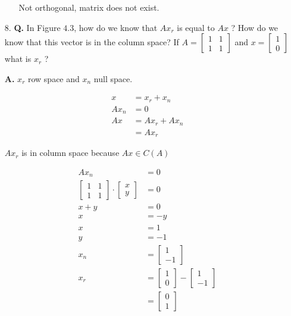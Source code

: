 \documentclass[main.tex]{subfiles}
\begin{document}
\begin{enumerate}
\begin{enumerate}
        Not orthogonal, matrix does not exist.
        
    \end{enumerate}
    
    \item [8.] \textbf{Q.} In Figure $4.3$, how do we know that $A x_{r}$ is equal to $A x$ ? How do we know that this vector is in the column space? If $A=\left[\begin{array}{ll}1 & 1 \\ 1 & 1\end{array}\right]$ and $x=\left[\begin{array}{l}1 \\ 0\end{array}\right]$ what is $x_{r}$ ? 
    
    \textbf{A.} $x_{r}$ row space and $x_{n}$ null space.
    
    $$
    \begin{aligned}
    x &= x_{r}+x_{n}\\
    A x_{n} &= 0 \\
    A x &= A x_{r}+A x_{n} \\
    &= A x_{r}
    \end{aligned}
    $$
    
    $A x_{r}$ is in column space because $A x \in C(A)$
    
    $$
    \begin{aligned}
    A x_{n} &= 0\\
    \left[\begin{array}{ll}
    1 & 1 \\
    1 & 1
    \end{array}\right] \cdot\left[\begin{array}{l}
    x \\
    y
    \end{array}\right] &=0 \\
    x+y &=0 \\
    x &=-y \\
    x&=1 \\
    y&=-1 \\
    x_{n} &= \left[\begin{array}{c}
    1 \\
    -1
    \end{array}\right] \\
    x_{r} &=\left[\begin{array}{l}
    1 \\
    0
    \end{array}\right]-\left[\begin{array}{c}
    1 \\
    -1
    \end{array}\right] \\
    &=\left[\begin{array}{l}
    0 \\
    1
    \end{array}\right]
    \end{aligned}
    $$


\end{enumerate}
\end{document}
